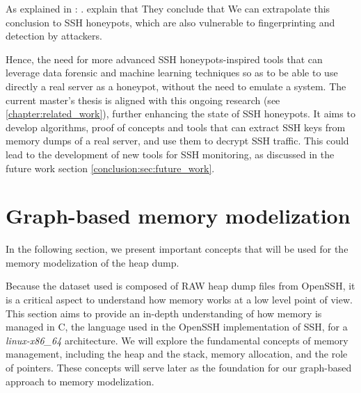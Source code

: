     As explained in : . \citeauthor{SSHHoneypotEffectiveness23} explain that  They conclude that  We can extrapolate this conclusion to SSH honeypots, which are also vulnerable to fingerprinting and detection by attackers. 
    
    Hence, the need for more advanced SSH honeypots-inspired tools that can leverage data forensic and machine learning techniques so as to be able to use directly a real server as a honeypot, without the need to emulate a system. The current master's thesis is aligned with this ongoing research (see \ref{chapter:related_work}), further enhancing the state of SSH honeypots. It aims to develop algorithms, proof of concepts and tools that can extract SSH keys from memory dumps of a real server, and use them to decrypt SSH traffic. This could lead to the development of new tools for SSH monitoring, as discussed in the future work section \ref{conclusion:sec:future_work}.

\section{Graph-based memory modelization}\label{sec:background:graph}

    In the following section, we present important concepts that will be used for the memory modelization of the heap dump.

    Because the dataset used is composed of RAW heap dump files from OpenSSH, it is a critical aspect to understand how memory works at a low level point of view. This section aims to provide an in-depth understanding of how memory is managed in C, the language used in the OpenSSH implementation of SSH, for a \textit{linux-x86\_64} architecture. We will explore the fundamental concepts of memory management, including the heap and the stack, memory allocation, and the role of pointers. These concepts will serve later as the foundation for our graph-based approach to memory modelization.

